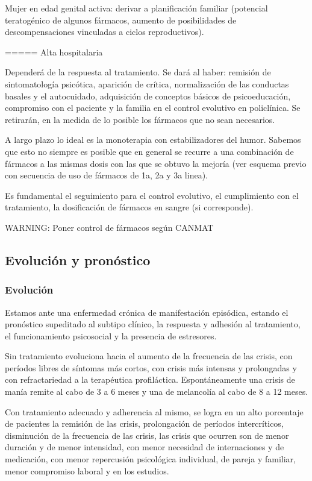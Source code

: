 Mujer en edad genital activa: derivar a planificación familiar (potencial teratogénico de algunos fármacos, aumento de posibilidades de descompensaciones vinculadas a ciclos reproductivos).

===== Alta hospitalaria

Dependerá de la respuesta al tratamiento. Se dará al haber: remisión de sintomatología psicótica, aparición de crítica, normalización de las conductas basales y el autocuidado, adquisición de conceptos básicos de psicoeducación, compromiso con el paciente y la familia en el control evolutivo en policlínica. Se retirarán, en la medida de lo posible los fármacos que no sean necesarios.

A largo plazo lo ideal es la monoterapia con estabilizadores del humor. Sabemos que esto no siempre es posible que en general se recurre a una combinación de fármacos a las mismas dosis con las que se obtuvo la mejoría (ver esquema previo con secuencia de uso de fármacos de 1a, 2a y 3a linea).

Es fundamental el seguimiento para el control evolutivo, el cumplimiento con el tratamiento, la dosificación de fármacos en sangre (si corresponde).

WARNING: Poner control de fármacos según CANMAT

\subsection*{Evolución y pronóstico}
\subsubsection*{Evolución}
Estamos ante una enfermedad crónica de manifestación episódica, estando el pronóstico supeditado al subtipo clínico, la respuesta y adhesión al tratamiento, el funcionamiento psicosocial y la presencia de estresores.

Sin tratamiento evoluciona hacia el aumento de la frecuencia de las crisis, con períodos libres de síntomas más cortos, con crisis más intensas y prolongadas y con refractariedad a la terapéutica profiláctica. Espontáneamente una crisis de manía remite al cabo de 3 a 6 meses y una de melancolía al cabo de 8 a 12 meses.

Con tratamiento adecuado y adherencia al mismo, se logra en un alto porcentaje de pacientes la remisión de las crisis, prolongación de períodos intercríticos, disminución de la frecuencia de las crisis, las crisis que ocurren son de menor duración y de menor intensidad, con menor necesidad de internaciones y de medicación, con menor repercusión psicológica individual, de pareja y familiar, menor compromiso laboral y en los estudios.
